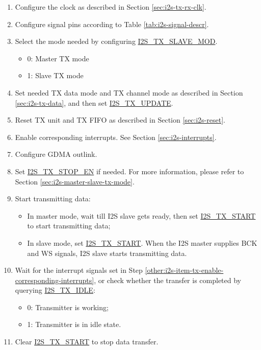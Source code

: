 \documentclass[main\_\_EN.tex]{subfiles}
\begin{document}
\begin{enumerate}
    \item Configure the clock as described in Section \ref{sec:i2s-tx-rx-clk}.
    \item Configure signal pins according to Table \ref{tab:i2s-signal-descr}.
    \item Select the mode needed by configuring \hyperref[fielddesc:I2STXSLAVEMOD]{I2S\_TX\_SLAVE\_MOD}.
    \begin{itemize}
        \item 0: Master TX mode
        \item 1: Slave TX mode
    \end{itemize}
    \item Set needed TX data mode and TX channel mode as described in Section \ref{sec:i2s-tx-data}, and then set \hyperref[fielddesc:I2STXUPDATE]{I2S\_TX\_UPDATE}.
    \item Reset TX unit and TX FIFO as described in Section \ref{sec:i2s-reset}.
    \item Enable corresponding interrupts. See Section \ref{sec:i2s-interrupts}.\label{other:i2s-item-tx-enable-corresponding-interrupts}
    \item Configure GDMA outlink. 
    \item Set \hyperref[fielddesc:I2STXSTOPEN]{I2S\_TX\_STOP\_EN} if needed. For more information, please refer to Section \ref{sec:i2s-master-slave-tx-mode}. 
    \item Start transmitting data:
    \begin{itemize}
        \item In master mode, wait till I2S slave gets ready, then set \hyperref[fielddesc:I2STXSTART]{I2S\_TX\_START} to start transmitting data;
        \item In slave mode, set \hyperref[fielddesc:I2STXSTART]{I2S\_TX\_START}. When the I2S master supplies BCK and WS signals, I2S slave starts transmitting data.
    \end{itemize}
    \item Wait for the interrupt signals set in Step \ref{other:i2s-item-tx-enable-corresponding-interrupts}, or check whether the transfer is completed by querying \hyperref[fielddesc:I2STXIDLE]{I2S\_TX\_IDLE}:
    \begin{itemize}
        \item 0: Transmitter is working;
        \item 1: Transmitter is in idle state.
    \end{itemize}
    \item Clear \hyperref[fielddesc:I2STXSTART]{I2S\_TX\_START} to stop data transfer.
\end{enumerate}
\end{document}
